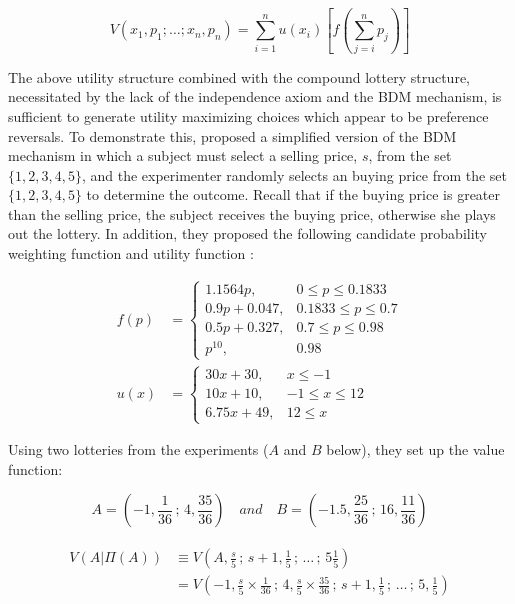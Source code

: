 \documentclass[11pt,a4paper]{report}
\begin{document}
\begin{equation}
	\label{eq:KS1987-EURDU}
	V(x_1,p_1; \ldots ; x_n, p_n) = \sum_{i=1}^{n}u(x_i) \left[ f\left( \sum_{j=i}^n p_j\right)  \right]
\end{equation}

The above utility structure combined with the compound lottery structure, necessitated by the lack of the independence axiom and the BDM mechanism, is sufficient to generate utility maximizing choices which appear to be preference reversals. To demonstrate this, \textcite{Karni1987} proposed a simplified version of the BDM mechanism in which a subject must select a selling price, $s$, from the set $\lbrace 1,2,3,4,5\rbrace$, and the experimenter randomly selects an buying price from the set $\lbrace 1,2,3,4,5 \rbrace$ to determine the outcome.
Recall that if the buying price is greater than the selling price, the subject receives the buying price, otherwise she plays out the lottery.
In addition, they proposed the following candidate probability weighting function and utility function :


\begin{align}
	f(p) &= 
	\begin{cases} 
		1.1564 p,     & 0 \leq p \leq 0.1833 \\
		0.9p + 0.047, & 0.1833 \leq p \leq 0.7 \\
		0.5p + 0.327, & 0.7 \leq p \leq 0.98 \\
		p^10,         & 0.98
	\end{cases}\label{eq:KS1987-pw}\\
	u(x) &= 
	\begin{cases} 
		30x + 30,     & x \leq -1 \\
		10x + 10,     & -1 \leq x \leq 12 \\
		6.75x + 49,   & 12 \leq x
	\end{cases}\label{eq:KS1987-ux}
\end{align}

Using two lotteries from the \textcite{Grether1979} experiments ($A$ and $B$ below), they set up the value function:

\begin{equation}
	\label{eq:KS1987-Alot}
	A = ( -1, \frac{1}{36} \,;\, 4, \frac{35}{36}) \quad \textit{and} \quad B=(-1.5, \frac{25}{36} \,;\, 16, \frac{11}{36})
\end{equation}

\begin{align}
	\label{eq:KS1987-VA}
	\begin{split}
		V(A|\Pi(A)) &\equiv V \left( A,\frac{s}{5} \,;\, s+1, \frac{1}{5} \,;\, \ldots \,;\, 5 \frac{1}{5} \right)\\
		            &=      V \left(-1,\frac{s}{5} \times \frac{1}{36} \,;\, 4, \frac{s}{5}\times \frac{35}{36} \,;\, s+1, \frac{1}{5} \,;\, \ldots \,;\, 5,\frac{1}{5}  \right)
	\end{split}
\end{align}
\end{document}
